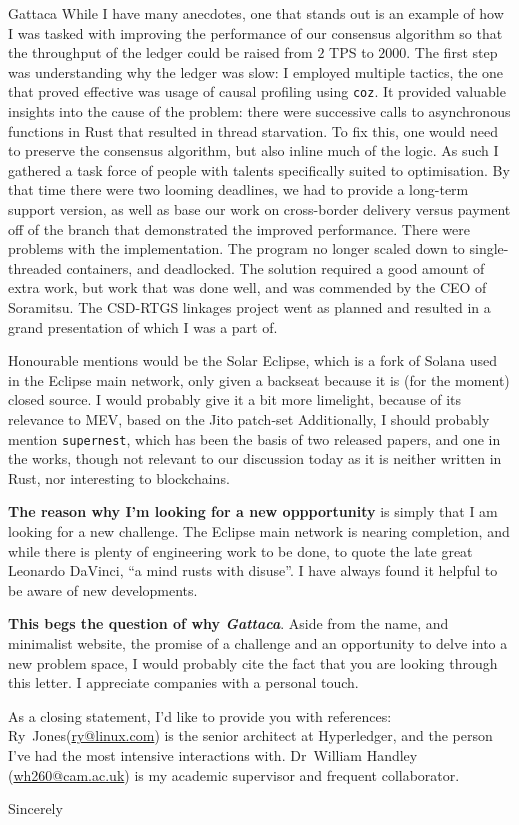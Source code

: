 \documentclass[
    12pt,
    a4paper,
    subject=titled,
    parskip=half,
    firsthead=true,
    fromalign=right,
    fromemail=true,
    fromurl=true,
    frommobilephone=true,
    backaddress=true,
]{scrlttr2}
\begin{document}
\begin{letter}{Gattaca}
While I have many anecdotes, one that stands out is an example of how
I was tasked with improving the performance of our consensus algorithm
so that the throughput of the ledger could be raised from $2$ TPS to
$2000$. The first step was understanding why the ledger was slow: I
employed multiple tactics, the one that proved effective was usage of
causal profiling using \texttt{coz}. It provided valuable insights
into the cause of the problem: there were successive calls to
asynchronous functions in Rust that resulted in thread starvation. To
fix this, one would need to preserve the consensus algorithm, but also
inline much of the logic. As such I gathered a task force of people
with talents specifically suited to optimisation. By that time there
were two looming deadlines, we had to provide a long-term support
version, as well as base our work on cross-border delivery versus
payment off of the branch that demonstrated the improved
performance. There were problems with the implementation. The program
no longer scaled down to single-threaded containers, and
deadlocked. The solution required a good amount of extra work, but
work that was done well, and was commended by the CEO of
Soramitsu. The CSD-RTGS linkages project went as planned and resulted
in a grand presentation of which I was a part of.

Honourable mentions would be the Solar Eclipse, which is a fork of
Solana used in the Eclipse main network, only given a backseat because
it is (for the moment) closed source. I would probably give it a bit
more limelight, because of its relevance to MEV, based on the Jito
patch-set Additionally, I should probably mention \texttt{supernest},
which has been the basis of two released papers, and one in the works,
though not relevant to our discussion today as it is neither written
in Rust, nor interesting to blockchains.

\vfill

\textbf{The reason why I'm looking for a new oppportunity} is simply
that I am looking for a new challenge.  The Eclipse main network is
nearing completion, and while there is plenty of engineering work to
be done, to quote the late great Leonardo DaVinci, ``a mind rusts with
disuse''.  I have always found it helpful to be aware of new
developments. 

\vfill

\textbf{This begs the question of why \textit{Gattaca}}.  Aside from
the name, and minimalist website, the promise of a challenge and an
opportunity to delve into a new problem space, I would probably cite
the fact that you are looking through this letter. I appreciate
companies with a personal touch.

As a closing statement, I'd like to provide you with references:
Ry~Jones(\href{mailto:ry@linux.com}{ry@linux.com}) is the senior
architect at Hyperledger, and the person I've had the most intensive
interactions with. Dr~William Handley
(\href{mailto:wh260@cam.ac.uk}{wh260@cam.ac.uk}) is my academic
supervisor and frequent collaborator.

\closing{Sincerely}
\end{letter}
\end{document}
